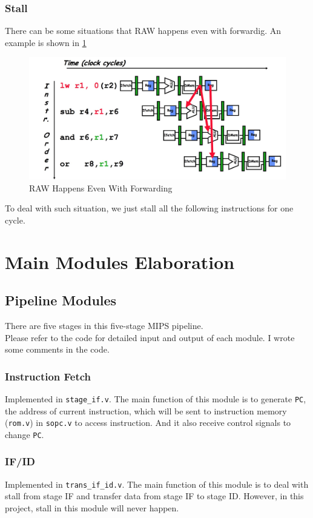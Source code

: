 \documentclass[paper=a4, fontsize=11pt]{scrartcl} %
\numberwithin{equation}{section} %
\numberwithin{figure}{section} %
\numberwithin{table}{section} %
\begin{document}
\begin{spacing}{1.5}
		\subsubsection{Stall}
			There can be some situations that RAW happens even with forwardig. An example is shown in \ref{fig::stall_0}
			\begin{figure}[H]
				\centering
				\includegraphics[width = 13 cm]{stall}
				\caption{RAW Happens Even With Forwarding}
				\label{fig::stall_0}
			\end{figure}
			To deal with such situation, we just stall all the following instructions for one cycle. 
			
\section{Main Modules Elaboration}
    \subsection{Pipeline Modules}
    	There are five stages in this five-stage MIPS pipeline.\\
    	Please refer to the code for detailed input and output of each module. I wrote some comments in the code.
    	\subsubsection{Instruction Fetch} Implemented in \verb|stage_if.v|. The main function of this module is to generate \verb|PC|, the address of current instruction, which will be sent to instruction memory (\verb|rom.v|) in \verb|sopc.v| to access instruction. And it also receive control signals to change \verb|PC|.
    	\subsubsection{IF/ID} Implemented in \verb|trans_if_id.v|. 
    	The main function of this module is to deal with stall from stage IF  and transfer data from stage IF  to stage ID. However, in this project, stall in this module will never happen.
    	

\end{spacing}
\end{document}
